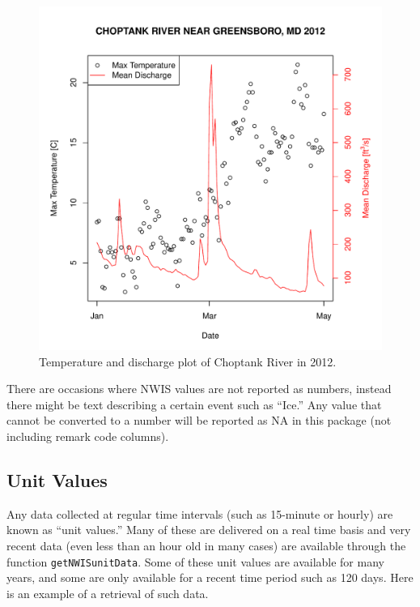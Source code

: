 \documentclass[a4paper,11pt]{article}\usepackage[]{graphicx}\usepackage[]{color}
\newenvironment{knitrout}{}{} %
\begin{document}
\begin{knitrout}
\begin{figure}[]
\includegraphics[width=1\linewidth,height=1\linewidth]{figure/getNWIStemperaturePlot} \caption[Temperature and discharge plot of Choptank River in 2012]{Temperature and discharge plot of Choptank River in 2012.\label{fig:getNWIStemperaturePlot}}
\end{figure}


\end{knitrout}


There are occasions where NWIS values are not reported as numbers, instead there might be text describing a certain event such as \enquote{Ice.}  Any value that cannot be converted to a number will be reported as NA in this package (not including remark code columns).

\FloatBarrier

\subsection{Unit Values}
\label{sec:usgsRT}
Any data collected at regular time intervals (such as 15-minute or hourly) are known as \enquote{unit values.} Many of these are delivered on a real time basis and very recent data (even less than an hour old in many cases) are available through the function \texttt{getNWISunitData}.  Some of these unit values are available for many years, and some are only available for a recent time period such as 120 days.  Here is an example of a retrieval of such data.  
\end{document}
